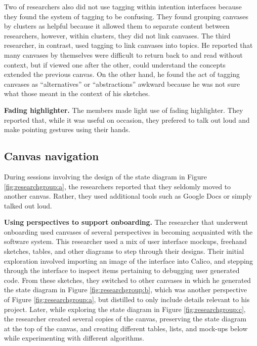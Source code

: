 Two of researchers also did not use tagging within intention interfaces because they found the system of tagging to be confusing. They found grouping canvases by clusters as helpful because it allowed them to separate content between researchers, however, within clusters, they did not link canvases. The third researcher, in contrast, used tagging to link canvases into topics. He reported that many canvases by themselves were difficult to return back to and read without context, but if viewed one after the other, could understand the concepts extended the previous canvas. On the other hand, he found the act of tagging canvases as ``alternatives'' or ``abstractions'' awkward because he was not sure what those meant in the context of his sketches.


\textbf{Fading highlighter.} The members made light use of fading highlighter. They reported that, while it was useful on occasion, they prefered to talk out loud and make pointing gestures using their hands.

\subsection{Canvas navigation}

During sessions involving the design of the state diagram in Figure \ref{fig:researchgroup:a}, the researchers reported that they seldomly moved to another canvas. Rather, they used additional tools such as Google Docs or simply talked out loud.

\textbf{Using perspectives to support onboarding.} The researcher that underwent onboarding used canvases of several perspectives in becoming acquainted with the software system. This researcher used a mix of user interface mockups, freehand sketches, tables, and other diagrams to step through their designs. Their initial exploration involved importing an image of the interface into Calico,  and stepping through the interface to inspect items pertaining to debugging user generated code. From these sketches, they switched to other canvases in which he generated the state diagram in Figure \ref{fig:researchgroup:b}, which was another perspective of Figure \ref{fig:researchgroup:a}, but distilled to only include details relevant to his project. Later, while exploring the state diagram in Figure \ref{fig:researchgroup:c}, the researcher created several copies of the canvas, preserving the state diagram at the top of the canvas, and creating different tables, lists, and mock-ups below while experimenting with different algorithms.

